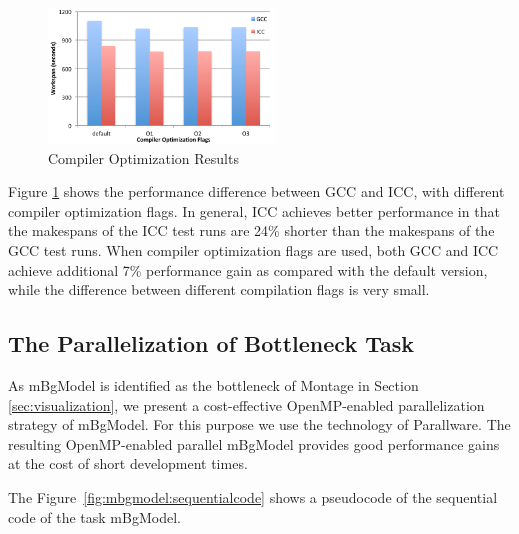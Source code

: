 \begin{figure}[t!]
\centering
\includegraphics[width=6cm]{fig01}
\vspace{-5pt}
\caption{Compiler Optimization Results}
\vspace{-10pt}
\label{fig:compiler}
\end{figure}


Figure \ref{fig:compiler} shows the performance difference between GCC and ICC, with different compiler optimization flags. In general, ICC achieves better performance in that the makespans of the ICC test runs are 24\% shorter than the makespans of the GCC test runs. When compiler optimization flags are used, both GCC and ICC achieve additional 7\% performance gain as compared with the default version, while the difference between different compilation flags is very small.

\subsection{The Parallelization of Bottleneck Task}
\label{v1_sec:parallware}

As mBgModel is identified as the bottleneck of Montage in Section \ref{sec:visualization}, we present a cost-effective OpenMP-enabled parallelization strategy of mBgModel. For this purpose we use the technology of Parallware. The resulting OpenMP-enabled parallel mBgModel provides good performance gains at the cost of short development times. 

The Figure~\ref{fig:mbgmodel:sequentialcode} shows a pseudocode of the sequential code of the task mBgModel. 


